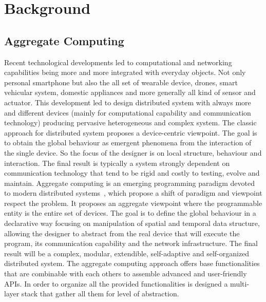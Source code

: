 \chapter{Background}
\label{chap:background}


\section{Aggregate Computing}
Recent technological developments led to computational and networking capabilities being more and more integrated with everyday objects. 
% 
Not only personal smartphone but also the all set of wearable device, drones, smart vehicular system, domestic appliances and more generally all kind of sensor and actuator.
% 
This development led to design distributed system with always more and different devices (mainly for computational capability and communication technology) producing pervasive heterogeneous and complex system.
% 
The classic approach for distributed system proposes a device-centric viewpoint. 
% 
The goal is to obtain the global behaviour as emergent phenomena from the interaction of the single device. 
% 
So the focus of the designer is on local structure, behaviour and interaction. 
% 
The final result is typically a system strongly dependent on communication technology that tend to be rigid and costly to testing, evolve and maintain.
% 
Aggregate computing is an emerging programming paradigm devoted to modern distributed systems~\cite{BealIEEEComputer2015}, which propose a shift of paradigm and viewpoint respect the problem. 
% 
It proposes an aggregate viewpoint where the programmable entity is the entire set of devices.
% 
The goal is to define the global behaviour in a declarative way focusing on manipulation of spatial and temporal data structure, allowing the designer to abstract from the real device that will execute the program, its communication capability and the network infrastructure. 
% 
The final result will be a complex, modular, extendible, self-adaptive and self-organized distributed system.
% 
The aggregate computing approach offers base functionalities that are combinable with each others to assemble advanced and user-friendly APIs. In order to organize all the provided functionalities is designed a multi-layer stack that gather all them for level of abstraction. 




